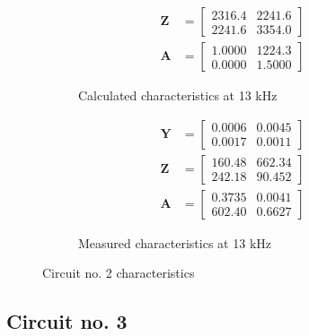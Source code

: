 \documentclass[notitlepage, a4paper, 11pt]{article}
\begin{document}
\begin{figure}[H]
\begin{subfigure}{0.45\textwidth}
\begin{align*}
				\mathbf{Z} &= 
				\begin{bmatrix}
				    2316.4  &  2241.6 \\
					2241.6  &  3354.0 
				\end{bmatrix}
				\\
				\mathbf{A} &= 
				\begin{bmatrix}
	 			   1.0000  &  1224.3 \\
					0.0000  &  1.5000
				\end{bmatrix}
			\end{align*}
			\caption{Calculated characteristics at 13 kHz}
		\end{subfigure}
		\hfill
		\begin{subfigure}{0.45\textwidth}
			\begin{align*}
				\mathbf{Y} &= 
				\begin{bmatrix}
					0.0006  &  0.0045 \\
					0.0017  &  0.0011
				\end{bmatrix}
				\\
				\mathbf{Z} &=
				\begin{bmatrix}
					160.48 & 662.34\\
					242.18 &  90.452
				\end{bmatrix} 		
				\\
				\mathbf{A} &= 
				\begin{bmatrix}
					0.3735   & 0.0041\\
					602.40  &  0.6627
				\end{bmatrix}
			\end{align*}
			\caption{Measured characteristics at 13 kHz}
		\end{subfigure}
		\caption{Circuit no. 2 characteristics}
	\end{figure}
	
	\subsection{Circuit no. 3}
	
\end{document}
